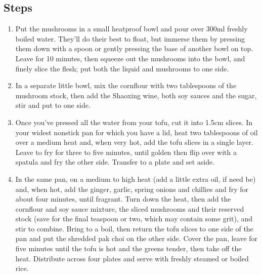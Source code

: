 \documentclass{book}
\begin{document}
\subsection*{Steps}
\begin{enumerate}
\item Put the mushrooms in a small heatproof bowl and pour over 300ml freshly boiled water. They’ll do their best to float, but immerse them by pressing them down with a spoon or gently pressing the base of another bowl on top. Leave for 10 minutes, then squeeze out the mushrooms into the bowl, and finely slice the flesh; put both the liquid and mushrooms to one side.
\item In a separate little bowl, mix the cornflour with two tablespoons of the mushroom stock, then add the Shaoxing wine, both soy sauces and the sugar, stir and put to one side.
\item Once you’ve pressed all the water from your tofu, cut it into 1.5cm slices. In your widest nonstick pan for which you have a lid, heat two tablespoons of oil over a medium heat and, when very hot, add the tofu slices in a single layer. Leave to fry for three to five minutes, until golden then flip over with a spatula and fry the other side. Transfer to a plate and set aside.
\item In the same pan, on a medium to high heat (add a little extra oil, if need be) and, when hot, add the ginger, garlic, spring onions and chillies and fry for about four minutes, until fragrant. Turn down the heat, then add the cornflour and soy sauce mixture, the sliced mushrooms and their reserved stock (save for the final teaspoon or two, which may contain some grit), and stir to combine. Bring to a boil, then return the tofu slices to one side of the pan and put the shredded pak choi on the other side. Cover the pan, leave for five minutes until the tofu is hot and the greens tender, then take off the heat. Distribute across four plates and serve with freshly steamed or boiled rice.
\end{enumerate}
\newpage
\end{document}
